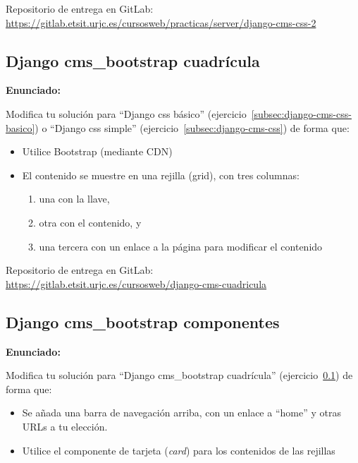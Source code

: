 Repositorio de entrega en GitLab: \\
\url{https://gitlab.etsit.urjc.es/cursosweb/practicas/server/django-cms-css-2}


\subsection{Django cms\_bootstrap cuadrícula}
\label{subsec:django-cms-bootstrap-1}

\textbf{Enunciado:}

Modifica tu solución para ``Django css básico'' (ejercicio~\ref{subsec:django-cms-css-basico}) o ``Django css simple'' (ejercicio~\ref{subsec:django-cms-css}) de forma que:

\begin{itemize}
  \item Utilice Bootstrap (mediante CDN)
  \item El contenido se muestre en una rejilla (grid), con tres columnas:
  \begin{enumerate}
    \item una con la llave, 
    \item otra con el contenido, y
    \item una tercera con un enlace a la página para modificar el contenido
  \end{enumerate}
\end{itemize}


Repositorio de entrega en GitLab: \\
\url{https://gitlab.etsit.urjc.es/cursosweb/django-cms-cuadricula}


\subsection{Django cms\_bootstrap componentes}
\label{subsec:django-cms-bootstrap-2}

\textbf{Enunciado:}

Modifica tu solución para ``Django cms\_bootstrap cuadrícula'' (ejercicio~\ref{subsec:django-cms-bootstrap-1}) de forma que:

\begin{itemize}
  \item Se añada una barra de navegación arriba, con un enlace a ``home'' y otras URLs a tu elección.
  \item Utilice el componente de tarjeta (\emph{card}) para los contenidos de las rejillas
\end{itemize}


